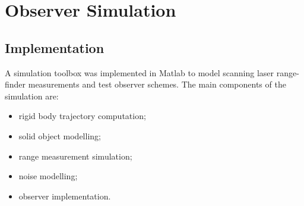 \chapter{Observer Simulation} \label{chap:simulation}
\section{Implementation}
A simulation toolbox was implemented in Matlab to model scanning laser range-finder measurements and test observer schemes. The main components of the simulation are:
\begin{itemize} \setlength\itemsep{-2mm}
\item rigid body trajectory computation;
\item solid object modelling;
\item range measurement simulation;
\item noise modelling;
\item observer implementation.
\end{itemize}

